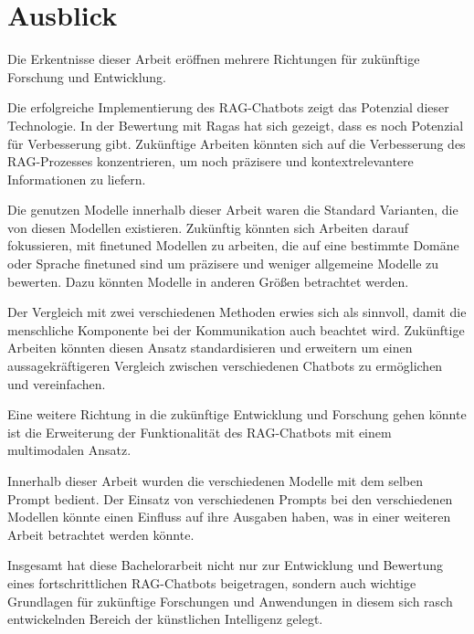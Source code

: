 \section{Ausblick}
Die Erkentnisse dieser Arbeit eröffnen mehrere Richtungen für
zukünftige Forschung und Entwicklung. \par

Die erfolgreiche Implementierung des RAG-Chatbots 
zeigt das Potenzial dieser Technologie. 
In der Bewertung mit Ragas hat sich gezeigt, 
dass es noch Potenzial für Verbesserung gibt.
Zukünftige 
Arbeiten könnten sich auf die Verbesserung 
des RAG-Prozesses konzentrieren, um noch 
präzisere und kontextrelevantere Informationen 
zu liefern.\par
Die genutzen Modelle innerhalb dieser Arbeit waren die 
Standard Varianten, die von diesen Modellen existieren.
Zukünftig könnten sich Arbeiten darauf fokussieren, 
mit finetuned Modellen zu arbeiten, die auf eine bestimmte 
Domäne oder Sprache finetuned sind um präzisere und weniger
allgemeine Modelle zu bewerten. Dazu könnten Modelle 
in anderen Größen betrachtet werden.\par
Der Vergleich mit zwei verschiedenen Methoden erwies sich als 
sinnvoll, damit die menschliche Komponente bei der 
Kommunikation auch beachtet wird. Zukünftige Arbeiten 
könnten diesen Ansatz standardisieren und erweitern um einen
aussagekräftigeren Vergleich zwischen verschiedenen
Chatbots zu ermöglichen und vereinfachen.\par
Eine weitere Richtung in die zukünftige Entwicklung 
und Forschung gehen könnte ist die Erweiterung der 
Funktionalität des RAG-Chatbots mit einem multimodalen
Ansatz.\par
Innerhalb dieser Arbeit wurden die verschiedenen
Modelle mit dem selben Prompt bedient. Der Einsatz von 
verschiedenen Prompts bei den verschiedenen Modellen
könnte einen Einfluss auf ihre Ausgaben haben, was 
in einer weiteren Arbeit betrachtet werden könnte.\par

Insgesamt hat diese Bachelorarbeit nicht nur zur 
Entwicklung und Bewertung eines fortschrittlichen 
RAG-Chatbots beigetragen, sondern auch wichtige 
Grundlagen für zukünftige Forschungen und 
Anwendungen in diesem sich rasch entwickelnden 
Bereich der künstlichen Intelligenz gelegt.